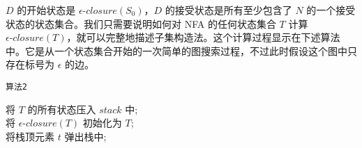 \documentclass[12pt]{article}
\begin{document}
$D$ 的开始状态是 $\epsilon \mbox{-} closure(S_{0})$，$D$ 的接受状态是所有至少包含了 $N$ 的一个接受状态的状态集合。我们只需要说明如何对 NFA 的任何状态集合 $T$ 计算 $\epsilon \mbox{-} closure(T)$，就可以完整地描述子集构造法。这个计算过程显示在下述算法中。它是从一个状态集合开始的一次简单的图搜索过程，不过此时假设这个图中只存在标号为 $\epsilon$ 的边。

\begin{algorithm}[H]
    \renewcommand{\thealgocf}{}
    \caption{\texttt{算法2}}
将 $T$ 的所有状态压入 $stack$ 中; \\
将 $\epsilon \mbox{-} closure(T)$ 初始化为 $T$; \\
 {
  将栈顶元素 $t$ 弹出栈中; \\
}
\end{algorithm}
\end{document}
